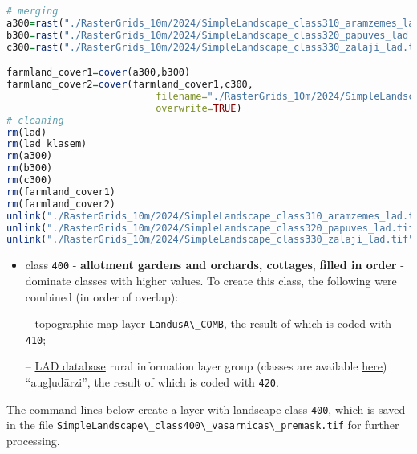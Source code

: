 \documentclass[
]{book}
\newcommand{\passthrough}[1]{#1}
\begin{document}
\begin{lstlisting}[language=R]
# merging
a300=rast("./RasterGrids_10m/2024/SimpleLandscape_class310_aramzemes_lad.tif")
b300=rast("./RasterGrids_10m/2024/SimpleLandscape_class320_papuves_lad.tif")
c300=rast("./RasterGrids_10m/2024/SimpleLandscape_class330_zalaji_lad.tif")

farmland_cover1=cover(a300,b300)
farmland_cover2=cover(farmland_cover1,c300,
                          filename="./RasterGrids_10m/2024/SimpleLandscape_class300_lauki_premask.tif",
                          overwrite=TRUE)
# cleaning
rm(lad)
rm(lad_klasem)
rm(a300)
rm(b300)
rm(c300)
rm(farmland_cover1)
rm(farmland_cover2)
unlink("./RasterGrids_10m/2024/SimpleLandscape_class310_aramzemes_lad.tif")
unlink("./RasterGrids_10m/2024/SimpleLandscape_class320_papuves_lad.tif")
unlink("./RasterGrids_10m/2024/SimpleLandscape_class330_zalaji_lad.tif")
\end{lstlisting}

\begin{itemize}
\item
  class \passthrough{\lstinline!400!} - \textbf{allotment gardens and orchards, cottages}, \textbf{filled in order} -
  dominate classes with higher values. To create this class, the following were
  combined (in order of overlap):

  -- \hyperref[Ch04.04]{topographic map} layer \passthrough{\lstinline!LandusA\_COMB!}, the result of which is coded with \passthrough{\lstinline!410!};

  -- \hyperref[Ch04.02]{LAD database} rural information layer group (classes are
  available \href{https://github.com/aavotins/HiQBioDiv_EGVs/blob/main/Data/Geodata/2024/LAD/KulturuKodi_2024.xlsx}{here})
  ``augļudārzi'', the result of which is coded with \passthrough{\lstinline!420!}.
\end{itemize}

The command lines below create a layer with landscape class \passthrough{\lstinline!400!}, which is saved
in the file \passthrough{\lstinline!SimpleLandscape\_class400\_vasarnicas\_premask.tif!} for further
processing.
\end{document}
